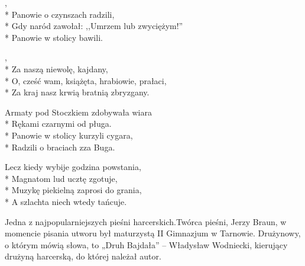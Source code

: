 \begin{lyrics}[longestline={Gdy naród zawołał: ,,Umrzem lub zwyciężym!''}]

,\\*
Panowie o czynszach radzili,\\*
Gdy naród zawołał: ,,Umrzem lub zwyciężym!''\\*
Panowie w stolicy bawili.

\begin{chorus}
,\\*
Za naszą niewolę, kajdany,\\*
O, cześć wam, książęta, hrabiowie, prałaci,\\*
Za kraj nasz krwią bratnią zbryzgany.
\end{chorus}

Armaty pod Stoczkiem zdobywała wiara\\*
Rękami czarnymi od pługa.\\*
Panowie w stolicy kurzyli cygara,\\*
Radzili o braciach zza Buga.

\chorusref

Lecz kiedy wybije godzina powstania,\\*
Magnatom lud ucztę zgotuje,\\*
Muzykę piekielną zaprosi do grania,\\*
A szlachta niech wtedy tańcuje.

\chorusref
\end{lyrics}



\begin{info}Jedna z najpopularniejszych pieśni harcerskich.Twórca pieśni, Jerzy Braun, w momencie pisania utworu był maturzystą II Gimnazjum w Tarnowie. Drużynowy, o którym mówią słowa, to „Druh Bajdała” – Władysław Wodniecki, kierujący drużyną harcerską, do której należał autor.\end{info}


